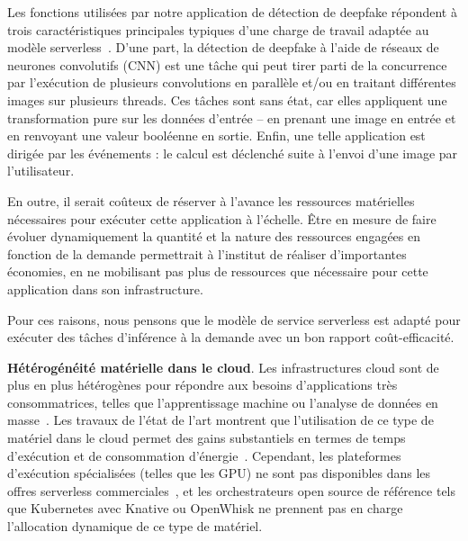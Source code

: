 
Les fonctions utilisées par notre application de détection de deepfake répondent à trois caractéristiques principales typiques d'une charge de travail adaptée au modèle serverless~\cite{cncf2018whitepaper}. D'une part, la détection de deepfake à l'aide de réseaux de neurones convolutifs (CNN) est une tâche qui peut tirer parti de la concurrence par l'exécution de plusieurs convolutions en parallèle et/ou en traitant différentes images sur plusieurs threads. Ces tâches sont sans état, car elles appliquent une transformation pure sur les données d'entrée -- en prenant une image en entrée et en renvoyant une valeur booléenne en sortie. Enfin, une telle application est dirigée par les événements : le calcul est déclenché suite à l'envoi d'une image par l'utilisateur.

En outre, il serait coûteux de réserver à l'avance les ressources matérielles nécessaires pour exécuter cette application à l'échelle. Être en mesure de faire évoluer dynamiquement la quantité et la nature des ressources engagées en fonction de la demande permettrait à l'institut de réaliser d'importantes économies, en ne mobilisant pas plus de ressources que nécessaire pour cette application dans son infrastructure. %

Pour ces raisons, nous pensons que le modèle de service serverless est adapté pour exécuter des tâches d'inférence à la demande avec un bon rapport coût-efficacité.

\textbf{Hétérogénéité matérielle dans le cloud}. Les infrastructures cloud sont de plus en plus hétérogènes pour répondre aux besoins d'applications très consommatrices, telles que l'apprentissage machine ou l'analyse de données en masse~\cite{reissHeterogeneityDynamicityClouds}. Les travaux de l'état de l'art montrent que l'utilisation de ce type de matériel dans le cloud permet des gains substantiels en termes de temps d'exécution et de consommation d'énergie~\cite{10.1145/3369583.3392679, 9195730}. Cependant, les plateformes d'exécution spécialisées (telles que les GPU) ne sont pas disponibles dans les offres serverless commerciales~\cite{khandelwalTaureauDeconstructingServerless2020}, et les orchestrateurs open source de référence tels que Kubernetes avec Knative ou OpenWhisk ne prennent pas en charge l'allocation dynamique de ce type de matériel.

